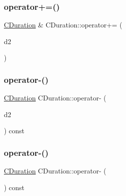 \subsubsection{\texorpdfstring{operator+=()}{operator+=()}}
{\footnotesize\ttfamily \mbox{\hyperlink{class_c_duration}{C\+Duration}} \& C\+Duration\+::operator+= (\begin{DoxyParamCaption}\item[{const \mbox{\hyperlink{class_c_duration}{C\+Duration}} \&}]{d2 }\end{DoxyParamCaption})}

\mbox{\label{class_c_duration_a632f49f5add3093c557a1ff32837380b}} 
\subsubsection{\texorpdfstring{operator-\/()}{operator-()}\hspace{0.1cm}{\footnotesize\ttfamily [1/2]}}
{\footnotesize\ttfamily \mbox{\hyperlink{class_c_duration}{C\+Duration}} C\+Duration\+::operator-\/ (\begin{DoxyParamCaption}\item[{const \mbox{\hyperlink{class_c_duration}{C\+Duration}} \&}]{d2 }\end{DoxyParamCaption}) const}

\mbox{\label{class_c_duration_a2cf513c8690e1c931fd70c547226c350}} 
\subsubsection{\texorpdfstring{operator-\/()}{operator-()}\hspace{0.1cm}{\footnotesize\ttfamily [2/2]}}
{\footnotesize\ttfamily \mbox{\hyperlink{class_c_duration}{C\+Duration}} C\+Duration\+::operator-\/ (\begin{DoxyParamCaption}{ }\end{DoxyParamCaption}) const}

\mbox{\label{class_c_duration_a171806344ce4878d7b76762a75e4b713}} 
